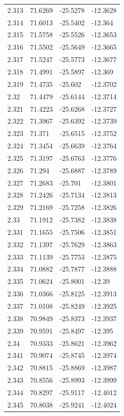 \begin{tabular}{llll}
2.313 & 71.6269 & -25.5278 & -12.3628 \\
2.314 & 71.6013 & -25.5402 & -12.364 \\
2.315 & 71.5758 & -25.5526 & -12.3653 \\
2.316 & 71.5502 & -25.5649 & -12.3665 \\
2.317 & 71.5247 & -25.5773 & -12.3677 \\
2.318 & 71.4991 & -25.5897 & -12.369 \\
2.319 & 71.4735 & -25.602 & -12.3702 \\
2.32 & 71.4479 & -25.6144 & -12.3714 \\
2.321 & 71.4223 & -25.6268 & -12.3727 \\
2.322 & 71.3967 & -25.6392 & -12.3739 \\
2.323 & 71.371 & -25.6515 & -12.3752 \\
2.324 & 71.3454 & -25.6639 & -12.3764 \\
2.325 & 71.3197 & -25.6763 & -12.3776 \\
2.326 & 71.294 & -25.6887 & -12.3789 \\
2.327 & 71.2683 & -25.701 & -12.3801 \\
2.328 & 71.2426 & -25.7134 & -12.3813 \\
2.329 & 71.2169 & -25.7258 & -12.3826 \\
2.33 & 71.1912 & -25.7382 & -12.3838 \\
2.331 & 71.1655 & -25.7506 & -12.3851 \\
2.332 & 71.1397 & -25.7629 & -12.3863 \\
2.333 & 71.1139 & -25.7753 & -12.3875 \\
2.334 & 71.0882 & -25.7877 & -12.3888 \\
2.335 & 71.0624 & -25.8001 & -12.39 \\
2.336 & 71.0366 & -25.8125 & -12.3913 \\
2.337 & 71.0108 & -25.8249 & -12.3925 \\
2.338 & 70.9849 & -25.8373 & -12.3937 \\
2.339 & 70.9591 & -25.8497 & -12.395 \\
2.34 & 70.9333 & -25.8621 & -12.3962 \\
2.341 & 70.9074 & -25.8745 & -12.3974 \\
2.342 & 70.8815 & -25.8869 & -12.3987 \\
2.343 & 70.8556 & -25.8993 & -12.3999 \\
2.344 & 70.8297 & -25.9117 & -12.4012 \\
2.345 & 70.8038 & -25.9241 & -12.4024 \\

\end{tabular}
